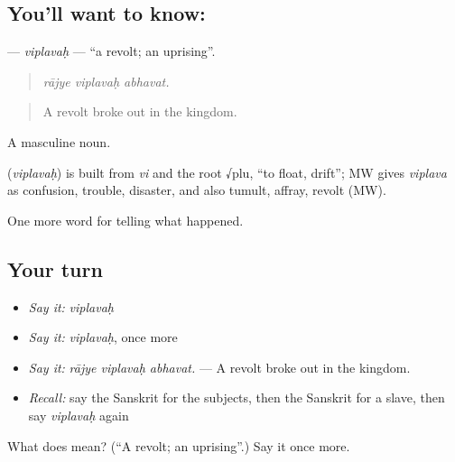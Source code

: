 \subsection*{You'll want to know: }
\textbf{} — \emph{viplavaḥ} — \textquotedblleft{}a revolt; an uprising\textquotedblright{}.

\begin{quote}
  
\end{quote}

\begin{quote}
\emph{rājye viplavaḥ abhavat.}
\end{quote}

\begin{quote}
A revolt broke out in the kingdom.
\end{quote}

A masculine noun.

\begin{cousinweb}
\textbf{} (\emph{viplavaḥ}) is built from \emph{vi} and the root √plu, \textquotedblleft{}to float, drift\textquotedblright{}; MW gives \emph{viplava} as confusion, trouble, disaster, and also tumult, affray, revolt (MW).
\end{cousinweb}

\begin{grammarlens}[title={What you've built}]
One more word for telling what happened.
\end{grammarlens}

\subsection*{Your turn}
\begin{itemize}
\raggedright
  \item \emph{Say it:} \emph{viplavaḥ}
  \item \emph{Say it:} \emph{viplavaḥ}, once more
  \item \emph{Say it:} \emph{rājye viplavaḥ abhavat.} — A revolt broke out in the kingdom.
  \item \emph{Recall:} say the Sanskrit for the subjects, then the Sanskrit for a slave, then say \emph{viplavaḥ} again
\end{itemize}

\begin{tcolorbox}[breakable,colback=teal!4,colframe=teal!35!black,title={Before you move on}]
What does  mean? (\textquotedblleft{}A revolt; an uprising\textquotedblright{}.) Say it once more.
\end{tcolorbox}
